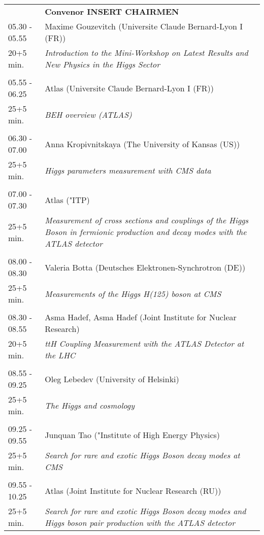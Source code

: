 \begin{longtable}{p{3cm}p{13cm}}
&\hfill {\bf Convenor INSERT CHAIRMEN }\\ 
05.30 - 05.55 & Maxime Gouzevitch (Universite Claude Bernard-Lyon I (FR))\\ 
20+5 min. & {\it Introduction to the Mini-Workshop on Latest Results and New Physics in the Higgs Sector}\\ 
 & \\ 
05.55 - 06.25 & Atlas (Universite Claude Bernard-Lyon I (FR))\\ 
25+5 min. & {\it BEH overview (ATLAS)}\\ 
 & \\ 
06.30 - 07.00 & Anna Kropivnitskaya (The University of Kansas (US))\\ 
25+5 min. & {\it Higgs parameters measurement with CMS data}\\ 
 & \\ 
07.00 - 07.30 & Atlas ("ITP)\\ 
25+5 min. & {\it Measurement of cross sections and couplings of the Higgs Boson in fermionic production and decay modes with the ATLAS detector}\\ 
 & \\ 
08.00 - 08.30 & Valeria Botta (Deutsches Elektronen-Synchrotron (DE))\\ 
25+5 min. & {\it Measurements of the Higgs H(125) boson at CMS}\\ 
 & \\ 
08.30 - 08.55 & Asma Hadef, Asma Hadef (Joint Institute for Nuclear Research)\\ 
20+5 min. & {\it ttH Coupling Measurement with the ATLAS Detector at the LHC}\\ 
 & \\ 
08.55 - 09.25 & Oleg Lebedev (University of Helsinki)\\ 
25+5 min. & {\it The Higgs and cosmology}\\ 
 & \\ 
09.25 - 09.55 & Junquan Tao ("Institute of High Energy Physics)\\ 
25+5 min. & {\it Search for rare and exotic Higgs Boson decay modes at CMS}\\ 
 & \\ 
09.55 - 10.25 & Atlas (Joint Institute for  Nuclear Research (RU))\\ 
25+5 min. & {\it Search for rare and exotic Higgs Boson decay modes and Higgs boson pair production with the ATLAS detector}\\ 

\end{longtable}

